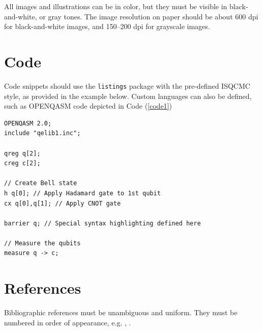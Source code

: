 \documentclass[10pt,twocolumn]{article}
\begin{document}
All images and illustrations can be in color, but they must be visible in black-and-white, or gray tones.
The image resolution on paper should be about 600 dpi for black-and-white images, and 150--200 dpi for grayscale images.

\section{Code}

Code snippets should use the \texttt{listings} package with the pre-defined ISQCMC style, as provided in the example below. Custom languages can also be defined, such as OPENQASM code depicted in Code (\ref{code1})

\footnotesize
\begin{lstlisting}[language=OPENQASM, caption=Bell Circuit,label=code1]
OPENQASM 2.0;
include "qelib1.inc";

qreg q[2];
creg c[2];

// Create Bell state
h q[0]; // Apply Hadamard gate to 1st qubit
cx q[0],q[1]; // Apply CNOT gate 

barrier q; // Special syntax highlighting defined here

// Measure the qubits
measure q -> c;
\end{lstlisting}
\normalsize

\section{References}

Bibliographic references must be unambiguous and uniform. They must be numbered in order of appearance, e.g. \cite{knuth:89}, \cite{smith:99}.




\end{document}
